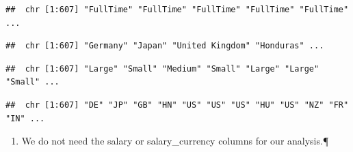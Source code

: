 \documentclass[
]{article}
\newenvironment{Shaded}{\begin{snugshade}}{\end{snugshade}}
\newcommand{\FunctionTok}[1]{\textcolor[rgb]{0.13,0.29,0.53}{\textbf{#1}}}
\newcommand{\NormalTok}[1]{#1}
\newcommand{\SpecialCharTok}[1]{\textcolor[rgb]{0.81,0.36,0.00}{\textbf{#1}}}
\providecommand{\tightlist}{%
  \setlength{\itemsep}{0pt}\setlength{\parskip}{0pt}}
\begin{document}
\begin{Shaded}
\end{Shaded}

\begin{verbatim}
##  chr [1:607] "FullTime" "FullTime" "FullTime" "FullTime" "FullTime" ...
\end{verbatim}

\begin{Shaded}
\end{Shaded}

\begin{verbatim}
##  chr [1:607] "Germany" "Japan" "United Kingdom" "Honduras" ...
\end{verbatim}

\begin{Shaded}
\end{Shaded}

\begin{verbatim}
##  chr [1:607] "Large" "Small" "Medium" "Small" "Large" "Large" "Small" ...
\end{verbatim}

\begin{Shaded}
\end{Shaded}

\begin{verbatim}
##  chr [1:607] "DE" "JP" "GB" "HN" "US" "US" "US" "HU" "US" "NZ" "FR" "IN" ...
\end{verbatim}

\begin{enumerate}
\def\labelenumi{\arabic{enumi}.}
\setcounter{enumi}{1}
\tightlist
\item
  We do not need the salary or salary\_currency columns for our
  analysis.¶
\end{enumerate}
\end{document}
